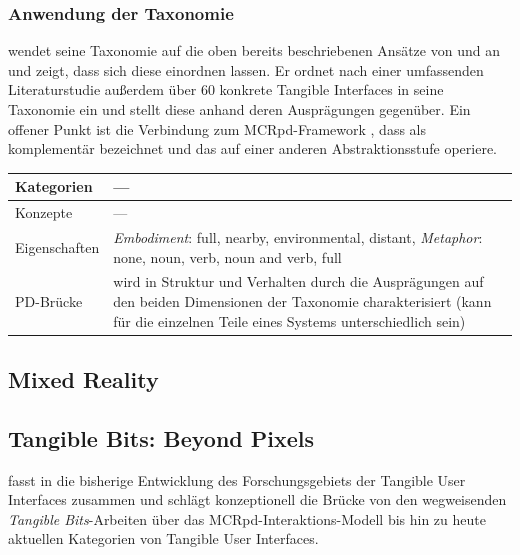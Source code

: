 \subsubsection{Anwendung der Taxonomie}
\citeauthor{Fishkin04} wendet seine Taxonomie auf die oben bereits beschriebenen Ansätze von \citep{Holmquist99} und \citep{Underkoffler99} an und zeigt, dass sich diese einordnen lassen. Er ordnet nach einer umfassenden Literaturstudie außerdem über 60 konkrete Tangible Interfaces in seine Taxonomie ein und stellt diese anhand deren Ausprägungen gegenüber. Ein offener Punkt ist die Verbindung zum \gls{MCRpd}-Framework \citep{Ullmer00}, dass \citeauthor{Fishkin04} als komplementär bezeichnet und das auf einer anderen Abstraktionsstufe operiere. 

\begin{tabular}{| p{3cm} | p{10cm} |}
  \hline
  Kategorien & --- \\ \hline
  Konzepte & --- \\ \hline
  Eigenschaften & \emph{Embodiment}: full, nearby, environmental, distant, \emph{Metaphor}: none, noun, verb, noun and verb, full\\ \hline
  PD-Brücke & wird in Struktur und Verhalten durch die Ausprägungen auf den beiden Dimensionen der Taxonomie charakterisiert (kann für die einzelnen Teile eines Systems unterschiedlich sein)  \\ \hline
\end{tabular} 


\subsection{Mixed Reality} %
\label{sub:mixed_reality}


\subsection{Tangible Bits: Beyond Pixels} %
\label{sub:tangible_bits_beyond_pixels}

\citeauthor{Ishii08} fasst in \citep{Ishii08} die bisherige Entwicklung des Forschungsgebiets der Tangible User Interfaces zusammen und schlägt konzeptionell die Brücke von den wegweisenden \emph{Tangible Bits}-Arbeiten über das MCRpd-Interaktions-Modell bis hin zu heute aktuellen Kategorien von Tangible User Interfaces.

